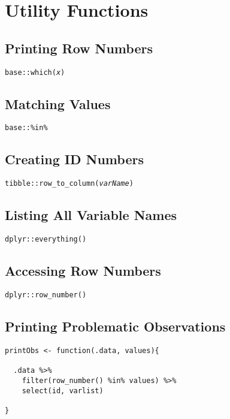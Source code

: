 \documentclass{tufte-handout}
\newenvironment{subs}
  {\adjustwidth{3em}{0pt}}
  {\endadjustwidth}
\begin{document}
\section{Utility Functions}
\begin{subs}
\subsection{Printing Row Numbers}
\noindent \texttt{base::}{\color{red}\texttt{which}}\texttt{(\textit{x})}

\vspace{3mm}
\subsection{Matching Values}
\noindent \texttt{base::}{\color{red}\texttt{\%in\%}}

\vspace{3mm}
\subsection{Creating ID Numbers}
\noindent \texttt{tibble::}{\color{red}\texttt{row\_to\_column}}\texttt{(\textit{varName})}

\vspace{3mm}
\subsection{Listing All Variable Names}
\noindent \texttt{dplyr::}{\color{red}\texttt{everything}}\texttt{()}

\vspace{3mm}
\subsection{Accessing Row Numbers}
\noindent \texttt{dplyr::}{\color{red}\texttt{row\_number}}\texttt{()}

\vspace{3mm}
\subsection{Printing Problematic Observations}
\begin{verbatim}
printObs <- function(.data, values){
  
  .data %>%
    filter(row_number() %in% values) %>%
    select(id, varlist)
  
}
\end{verbatim}
\end{subs}
\end{document}
